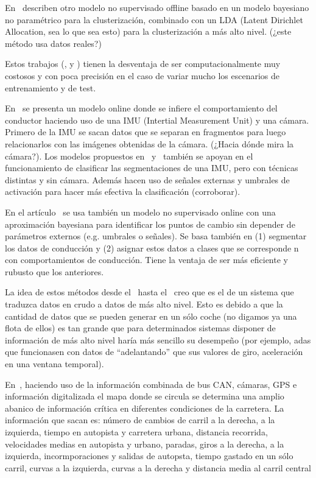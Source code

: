En~\cite{bando2013unsupervised} describen otro modelo no supervisado offline basado en un modelo bayesiano no paramétrico para la clusterización, combinado con un LDA (Latent Dirichlet Allocation, sea lo que sea esto) para la clusterización a más alto nivel. (\TODO ¿este método usa datos reales?)

Estos trabajos (\cite{sekizawa2007modeling}, \cite{terada2010multi} y \cite{bando2013unsupervised}) tienen la desventaja de ser computacionalmente muy costosos y con poca precisión en el caso de variar mucho los escenarios de entrenamiento y de test.

En~\cite{maye2011bayesian} se presenta un modelo online donde se infiere el comportamiento del conductor haciendo uso de una IMU (Intertial Measurement Unit) y una cámara. Primero de la IMU se sacan datos que se separan en fragmentos para luego relacionarlos con las imágenes obtenidas de la cámara. (\TODO ¿Hacia dónde mira la cámara?). Los modelos propuestos en~\cite{johnson2011driving} y~\cite{van2013driver} también se apoyan en el funcionamiento de clasificar las segmentaciones de una IMU, pero con técnicas distintas y sin cámara. Además hacen uso de señales externas y umbrales de activación para hacer más efectiva la clasificación (\TODO corroborar).

En el artículo~\cite{bender2015unsupervised} se usa también un modelo no supervisado online con una aproximación bayesiana para identificar los puntos de cambio sin depender de parámetros externos (e.g. umbrales o señales). Se basa también en (1) segmentar los datos de conducción y (2) asignar estos datos a clases que se corresponde n con comportamientos de conducción. Tiene la ventaja de ser más eficiente y rubusto que los anteriores.

La idea de estos métodos desde el~\cite{sekizawa2007modeling} hasta el~\cite{bender2015unsupervised} creo que es el de un sistema que traduzca datos en crudo a datos de más alto nivel. Esto es debido a que la cantidad de datos que se pueden generar en un sólo coche (no digamos ya una flota de ellos) es tan grande que para determinados sistemas disponer de información de más alto nivel haría más sencillo su desempeño (por ejemplo, \gls{adas} que funcionasen con datos de \enquote{adelantando} que sus valores de giro, aceleración en una ventana temporal).

En~\cite{satzoda2013towards}, haciendo uso de la información combinada de bus CAN, cámaras, GPS e información digitalizada el mapa donde se circula se determina una amplio abanico de información crítica en diferentes condiciones de la carretera. La información que sacan es: número de cambios de carril a la derecha, a la izquierda, tiempo en autopista y carretera urbana, distancia recorrida, velocidades medias en autopista y urbano, paradas, giros a la derecha, a la izquierda, incormporaciones y salidas de autopsta, tiempo gastado en un sólo carril, curvas a la izquierda, curvas a la derecha y distancia media al carril central


